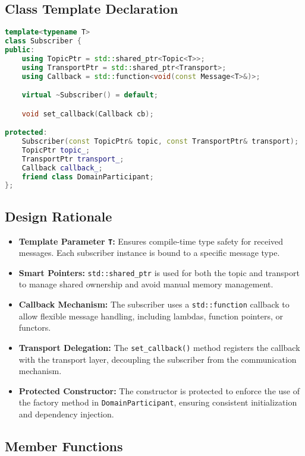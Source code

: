 \documentclass[12pt]{report}
\begin{document}
\subsection{Class Template Declaration}
\begin{lstlisting}[language=C++]
template<typename T>
class Subscriber {
public:
    using TopicPtr = std::shared_ptr<Topic<T>>;
    using TransportPtr = std::shared_ptr<Transport>;
    using Callback = std::function<void(const Message<T>&)>;

    virtual ~Subscriber() = default;

    void set_callback(Callback cb);

protected:
    Subscriber(const TopicPtr& topic, const TransportPtr& transport);
    TopicPtr topic_;
    TransportPtr transport_;
    Callback callback_;
    friend class DomainParticipant;
};
\end{lstlisting}

\subsection{Design Rationale}
\begin{itemize}
    \item \textbf{Template Parameter \texttt{T}:} Ensures compile-time type safety for received messages. Each subscriber instance is bound to a specific message type.
    \item \textbf{Smart Pointers:} \texttt{std::shared\_ptr} is used for both the topic and transport to manage shared ownership and avoid manual memory management.
    \item \textbf{Callback Mechanism:} The subscriber uses a \texttt{std::function} callback to allow flexible message handling, including lambdas, function pointers, or functors.
    \item \textbf{Transport Delegation:} The \texttt{set\_callback()} method registers the callback with the transport layer, decoupling the subscriber from the communication mechanism.
    \item \textbf{Protected Constructor:} The constructor is protected to enforce the use of the factory method in \texttt{DomainParticipant}, ensuring consistent initialization and dependency injection.
\end{itemize}

\subsection{Member Functions}
\end{document}
